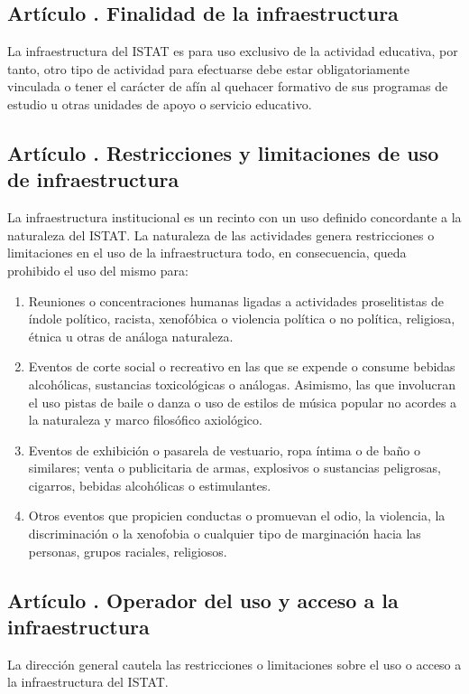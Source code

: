 \subsection{Artículo . Finalidad de la infraestructura}
\addtocounter{ns}{1}
La infraestructura del ISTAT es para uso exclusivo de la actividad educativa, por tanto, otro tipo de actividad para efectuarse debe estar obligatoriamente vinculada o tener el carácter de afín al quehacer formativo de sus programas de estudio u otras unidades de apoyo o servicio educativo.
\subsection{Artículo . Restricciones y limitaciones de uso de infraestructura}
\addtocounter{ns}{1}
La infraestructura institucional es un recinto con un uso definido concordante a la naturaleza del ISTAT. La naturaleza de las actividades genera restricciones o limitaciones en el uso de la infraestructura todo, en consecuencia, queda prohibido el uso del mismo para: 
\begin{enumerate}
\item Reuniones o concentraciones humanas ligadas a actividades proselitistas de índole político, racista, xenofóbica o violencia política o no política, religiosa, étnica u otras de análoga naturaleza. 
\item Eventos de corte social o recreativo en las que se expende o consume bebidas alcohólicas, sustancias toxicológicas o análogas. Asimismo, las que involucran el uso pistas de baile o danza o uso de estilos de música popular no acordes a la naturaleza y marco filosófico axiológico. 
\item Eventos de exhibición o pasarela de vestuario, ropa íntima o de baño o similares; venta o publicitaria de armas, explosivos o sustancias peligrosas, cigarros, bebidas alcohólicas o estimulantes. 
\item Otros eventos que propicien conductas o promuevan el odio, la violencia, la discriminación o la xenofobia o cualquier tipo de marginación hacia las personas, grupos raciales, religiosos.
\end{enumerate}
\subsection{Artículo . Operador del uso y acceso a la infraestructura}
\addtocounter{ns}{1}
La dirección general cautela las restricciones o limitaciones sobre el uso o acceso a la infraestructura del ISTAT. 

